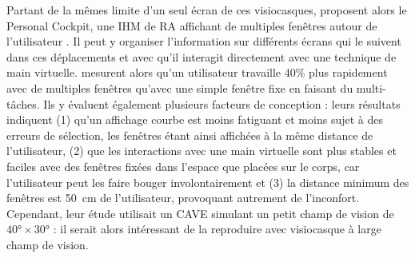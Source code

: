 Partant de la mêmes limite d'un seul écran de ces visiocasques, \cite{Ens2014} proposent alors le Personal Cockpit, une IHM de RA affichant de multiples fenêtres autour de l'utilisateur . Il peut y organiser l'information sur différents écrans qui le suivent dans ces déplacements et avec qu'il interagit directement avec une technique de main virtuelle. \citeauthor{Ens2014} mesurent alors qu'un utilisateur travaille 40\% plus rapidement avec de multiples fenêtres qu'avec une simple fenêtre fixe en faisant du multi-tâches. Ils y évaluent également plusieurs facteurs de conception : leurs résultats indiquent (1) qu'un affichage courbe est moins fatiguant et moins sujet à des erreurs de sélection, les fenêtres étant ainsi affichées à la même distance de l'utilisateur, (2) que les interactions avec une main virtuelle sont plus stables et faciles avec des fenêtres fixées dans l'espace que placées sur le corps, car l'utilisateur peut les faire bouger involontairement et (3) la distance minimum des fenêtres est \SI{50}{\cm} de l'utilisateur, provoquant autrement de l'inconfort. Cependant, leur étude utilisait un CAVE simulant un petit champ de vision de $\ang{40} \times \ang{30}$ : il serait alors intéressant de la reproduire avec visiocasque à large champ de vision.


